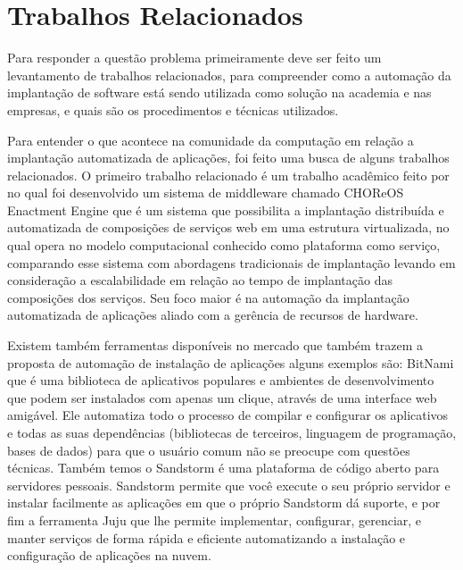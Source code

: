 \section{Trabalhos Relacionados}
\label{section:trabalhos_relacionados}
Para responder a questão problema primeiramente deve ser feito um levantamento
de trabalhos relacionados, para compreender como a automação da implantação
de software está sendo utilizada como solução na academia e nas empresas, e
quais são os procedimentos e técnicas utilizados.

Para entender o que acontece na comunidade da computação em relação a implantação
automatizada de aplicações, foi feito uma busca de alguns trabalhos relacionados. O primeiro
trabalho relacionado é um trabalho acadêmico feito por \cite{leo2014} no qual foi
desenvolvido um sistema de middleware chamado CHOReOS Enactment Engine que é um
sistema que possibilita a implantação distribuída e automatizada de composições
de serviços web em uma estrutura virtualizada, no qual opera no modelo
computacional conhecido como plataforma como serviço, comparando esse sistema
com abordagens tradicionais de implantação levando em consideração a escalabilidade
em relação ao tempo de implantação das composições dos serviços. Seu foco maior
é na automação da implantação automatizada de aplicações aliado com a gerência de recursos
de hardware.

Existem também ferramentas disponíveis no mercado que também trazem a proposta
de automação de instalação de aplicações alguns exemplos são: \cite{bitnami}
BitNami que é uma biblioteca de aplicativos populares e ambientes de
desenvolvimento que podem ser instalados com apenas um clique, através de uma interface web
amigável. Ele automatiza todo o
processo de compilar e configurar os aplicativos e todas as suas dependências
(bibliotecas de terceiros, linguagem de programação, bases de dados) para que o
usuário comum não se preocupe com questões técnicas. Também temos o \cite{sandstormio}
Sandstorm é uma plataforma de código aberto para servidores
pessoais. Sandstorm permite que você execute o seu próprio servidor e instalar
facilmente as aplicações em que o próprio Sandstorm dá suporte, e por fim a ferramenta \cite{juju}
Juju que lhe permite implementar, configurar, gerenciar, e manter serviços de forma
rápida e eficiente automatizando a instalação e configuração de aplicações na nuvem.

